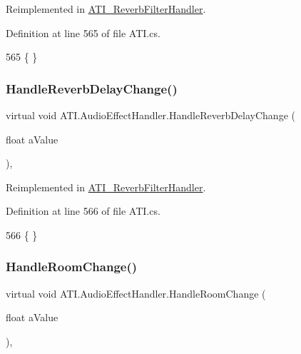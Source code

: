 Reimplemented in \hyperlink{class_a_t_i___reverb_filter_handler_ae228f1d67c8efd950a3b2c594d5dd9f8}{A\+T\+I\+\_\+\+Reverb\+Filter\+Handler}.



Definition at line 565 of file A\+T\+I.\+cs.


\begin{DoxyCode}
565 \{ \}
\end{DoxyCode}
\mbox{\label{class_a_t_i_1_1_audio_effect_handler_a03f47bb2ac36fc9c672ccddd76af6e6a}} 
\subsubsection{\texorpdfstring{Handle\+Reverb\+Delay\+Change()}{HandleReverbDelayChange()}}
{\footnotesize\ttfamily virtual void A\+T\+I.\+Audio\+Effect\+Handler.\+Handle\+Reverb\+Delay\+Change (\begin{DoxyParamCaption}\item[{float}]{a\+Value }\end{DoxyParamCaption})\hspace{0.3cm}{\ttfamily [protected]}, {\ttfamily [virtual]}}



Reimplemented in \hyperlink{class_a_t_i___reverb_filter_handler_af126757d50b12330f868d2178bdb5d6c}{A\+T\+I\+\_\+\+Reverb\+Filter\+Handler}.



Definition at line 566 of file A\+T\+I.\+cs.


\begin{DoxyCode}
566 \{ \}
\end{DoxyCode}
\mbox{\label{class_a_t_i_1_1_audio_effect_handler_a416ae6f8266224b0d6cd71cba1020001}} 
\subsubsection{\texorpdfstring{Handle\+Room\+Change()}{HandleRoomChange()}}
{\footnotesize\ttfamily virtual void A\+T\+I.\+Audio\+Effect\+Handler.\+Handle\+Room\+Change (\begin{DoxyParamCaption}\item[{float}]{a\+Value }\end{DoxyParamCaption})\hspace{0.3cm}{\ttfamily [protected]}, {\ttfamily [virtual]}}




